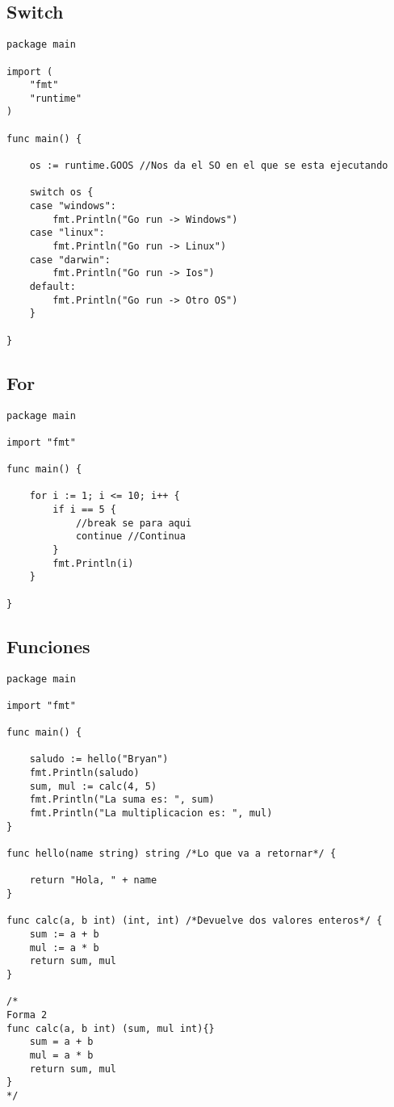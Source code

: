 \documentclass[10pt,a4paper]{article}
\begin{document}
\subsection{Switch}

\begin{verbatim}
package main

import (
	"fmt"
	"runtime"
)

func main() {

	os := runtime.GOOS //Nos da el SO en el que se esta ejecutando

	switch os {
	case "windows":
		fmt.Println("Go run -> Windows")
	case "linux":
		fmt.Println("Go run -> Linux")
	case "darwin":
		fmt.Println("Go run -> Ios")
	default:
		fmt.Println("Go run -> Otro OS")
	}

}
\end{verbatim}

\subsection{For}
\begin{verbatim}
package main

import "fmt"

func main() {

	for i := 1; i <= 10; i++ {
		if i == 5 {
			//break se para aqui
			continue //Continua
		}
		fmt.Println(i)
	}

}
\end{verbatim}
\newpage
\subsection{Funciones}

\begin{verbatim}
package main

import "fmt"

func main() {

	saludo := hello("Bryan")
	fmt.Println(saludo)
	sum, mul := calc(4, 5)
	fmt.Println("La suma es: ", sum)
	fmt.Println("La multiplicacion es: ", mul)
}

func hello(name string) string /*Lo que va a retornar*/ {

	return "Hola, " + name
}

func calc(a, b int) (int, int) /*Devuelve dos valores enteros*/ {
	sum := a + b
	mul := a * b
	return sum, mul
}

/*
Forma 2
func calc(a, b int) (sum, mul int){}
	sum = a + b
	mul = a * b
	return sum, mul
}
*/
\end{verbatim}
\end{document}

